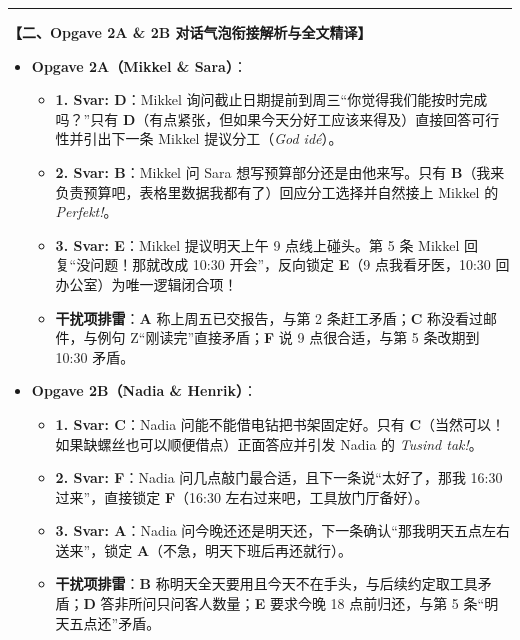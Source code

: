 \begin{answerbox}
\vspace{0.45em}
\hrule
\vspace{0.45em}
\textbf{\color{NCDNavy}【二、Opgave 2A \& 2B 对话气泡衔接解析与全文精译】}
\begin{itemize}
  \item \textbf{Opgave 2A（Mikkel \& Sara）}：
    \begin{itemize}
      \item \textbf{1. Svar: D}：Mikkel 询问截止日期提前到周三“你觉得我们能按时完成吗？”只有 \textbf{D}（有点紧张，但如果今天分好工应该来得及）直接回答可行性并引出下一条 Mikkel 提议分工（\textit{God idé}）。
      \item \textbf{2. Svar: B}：Mikkel 问 Sara 想写预算部分还是由他来写。只有 \textbf{B}（我来负责预算吧，表格里数据我都有了）回应分工选择并自然接上 Mikkel 的 \textit{Perfekt!}。
      \item \textbf{3. Svar: E}：Mikkel 提议明天上午 9 点线上碰头。第 5 条 Mikkel 回复“没问题！那就改成 10:30 开会”，反向锁定 \textbf{E}（9 点我看牙医，10:30 回办公室）为唯一逻辑闭合项！
      \item \textbf{干扰项排雷}：\textbf{A} 称上周五已交报告，与第 2 条赶工矛盾；\textbf{C} 称没看过邮件，与例句 Z“刚读完”直接矛盾；\textbf{F} 说 9 点很合适，与第 5 条改期到 10:30 矛盾。
    \end{itemize}
  \item \textbf{Opgave 2B（Nadia \& Henrik）}：
    \begin{itemize}
      \item \textbf{1. Svar: C}：Nadia 问能不能借电钻把书架固定好。只有 \textbf{C}（当然可以！如果缺螺丝也可以顺便借点）正面答应并引发 Nadia 的 \textit{Tusind tak!}。
      \item \textbf{2. Svar: F}：Nadia 问几点敲门最合适，且下一条说“太好了，那我 16:30 过来”，直接锁定 \textbf{F}（16:30 左右过来吧，工具放门厅备好）。
      \item \textbf{3. Svar: A}：Nadia 问今晚还还是明天还，下一条确认“那我明天五点左右送来”，锁定 \textbf{A}（不急，明天下班后再还就行）。
      \item \textbf{干扰项排雷}：\textbf{B} 称明天全天要用且今天不在手头，与后续约定取工具矛盾；\textbf{D} 答非所问只问客人数量；\textbf{E} 要求今晚 18 点前归还，与第 5 条“明天五点还”矛盾。
    \end{itemize}
\end{itemize}


\end{answerbox}
